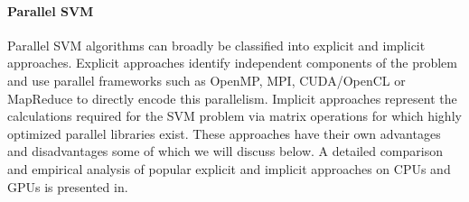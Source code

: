 \paragraph{Parallel SVM}
Parallel SVM algorithms can broadly be classified into explicit and implicit approaches. Explicit approaches identify  independent components of the problem and use parallel frameworks such as OpenMP, MPI, CUDA/OpenCL or MapReduce to directly encode this parallelism. Implicit approaches represent the calculations required for the SVM problem via matrix operations for which highly optimized parallel libraries exist. These approaches have their own advantages and disadvantages some of which we will discuss below. A detailed comparison and empirical analysis of popular explicit and implicit approaches on CPUs and GPUs is presented in.
